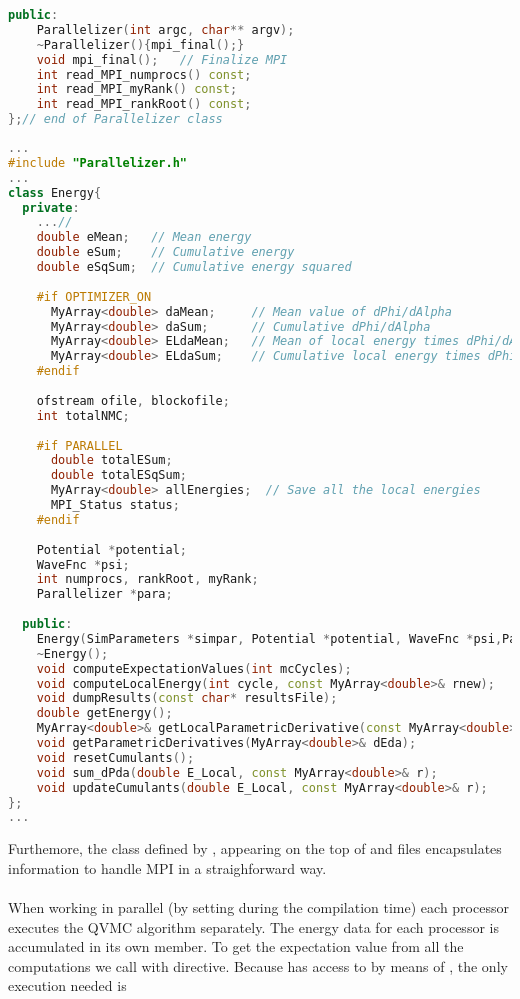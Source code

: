 \begin{lstlisting}[language=c++]
  public: 
    Parallelizer(int argc, char** argv);
    ~Parallelizer(){mpi_final();}
    void mpi_final();	// Finalize MPI
    int read_MPI_numprocs() const;
    int read_MPI_myRank() const;
    int read_MPI_rankRoot() const;
};// end of Parallelizer class
\end{lstlisting}



\begin{lstlisting}[language=c++]
...
#include "Parallelizer.h"
...
class Energy{
  private:
    ...// 
    double eMean;	// Mean energy
    double eSum;	// Cumulative energy 
    double eSqSum;	// Cumulative energy squared
    
    #if OPTIMIZER_ON
      MyArray<double> daMean;	  // Mean value of dPhi/dAlpha
      MyArray<double> daSum;	  // Cumulative dPhi/dAlpha
      MyArray<double> ELdaMean;	  // Mean of local energy times dPhi/dAlpha
      MyArray<double> ELdaSum;	  // Cumulative local energy times dPhi/dAlpha
    #endif
                      
    ofstream ofile, blockofile; 
    int totalNMC;
  
    #if PARALLEL
      double totalESum;
      double totalESqSum;
      MyArray<double> allEnergies;	// Save all the local energies
      MPI_Status status;
    #endif
  
    Potential *potential;
    WaveFnc *psi;
    int numprocs, rankRoot, myRank;
    Parallelizer *para;
    
  public:  
    Energy(SimParameters *simpar, Potential *potential, WaveFnc *psi,Parallelizer * para);
    ~Energy();
    void computeExpectationValues(int mcCycles);
    void computeLocalEnergy(int cycle, const MyArray<double>& rnew);
    void dumpResults(const char* resultsFile);
    double getEnergy();
    MyArray<double>& getLocalParametricDerivative(const MyArray<double>& r);
    void getParametricDerivatives(MyArray<double>& dEda); 
    void resetCumulants();
    void sum_dPda(double E_Local, const MyArray<double>& r);
    void updateCumulants(double E_Local, const MyArray<double>& r);
};
...
\end{lstlisting}
Furthemore, the class defined by , appearing on the top of  and  files encapsulates information to handle MPI in a straighforward way.\\
\\
When working in parallel (by setting  during the compilation time) each processor executes the QVMC algorithm separately. The energy data for each processor is accumulated in its own  member. To get the expectation value from all the computations we call  with  directive. Because  has access to  by means of , the only execution needed is
